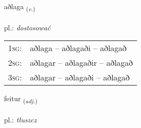 \documentclass[frontgrid, backgrid]{flacards}\usepackage[]{graphicx}\usepackage[]{xcolor}
\begin{document}
\renewcommand{\flhead}{\vskip5pt \fboxsep=0pt {\small\bfseries\footnotesize Sagnorð | czasownik}}
\renewcommand{\fcfoot}{\vskip5pt \fboxsep=0pt \hspace{2pt}{\small\bfseries\footnotesize 3K}}

\renewcommand{\blhead}{\vskip5pt {\small\bfseries\footnotesize Sagnorð | czasownik }}
\renewcommand{\bcfoot}{\vskip5pt \hspace{2pt}{\small\bfseries\footnotesize 3K}}


{aðlaga \small{\textsubscript{(\textit{v.})}} \\[1ex] %
\textphonetic{[aðlaɣa]} \\
pl.: \emph{dostosować} \\  [2ex]
\renewcommand*{\arraystretch}{0.8}
\begin{tabular}{p{1cm}l}
\textsc{1sg}: & aðlaga -- aðlagaði -- aðlagað \\ 
\textsc{2sg}: & aðlagar -- aðlagaðir -- aðlagað \\ 
\textsc{3sg}: & aðlagar -- aðlagaði -- aðlagað \\ 
\end{tabular}
}

\renewcommand{\flhead}{\vskip5pt \fboxsep=0pt {\small\bfseries\footnotesize Lýsingarorð | przymiotnik}}
\renewcommand{\fcfoot}{\vskip5pt \fboxsep=0pt \hspace{2pt}{\small\bfseries\footnotesize 3K}}

\renewcommand{\blhead}{\vskip5pt {\small\bfseries\footnotesize Lýsingarorð | przymiotnik }}
\renewcommand{\bcfoot}{\vskip5pt \hspace{2pt}{\small\bfseries\footnotesize 3K}}


{feitur \small{\textsubscript{(\textit{adj.})}} \\[1ex] %
\textphonetic{[feiːtʏr]} \\
pl.: \emph{tłuszcz} \\  [2ex]
\renewcommand*{\arraystretch}{0.8}
}
\end{document}
